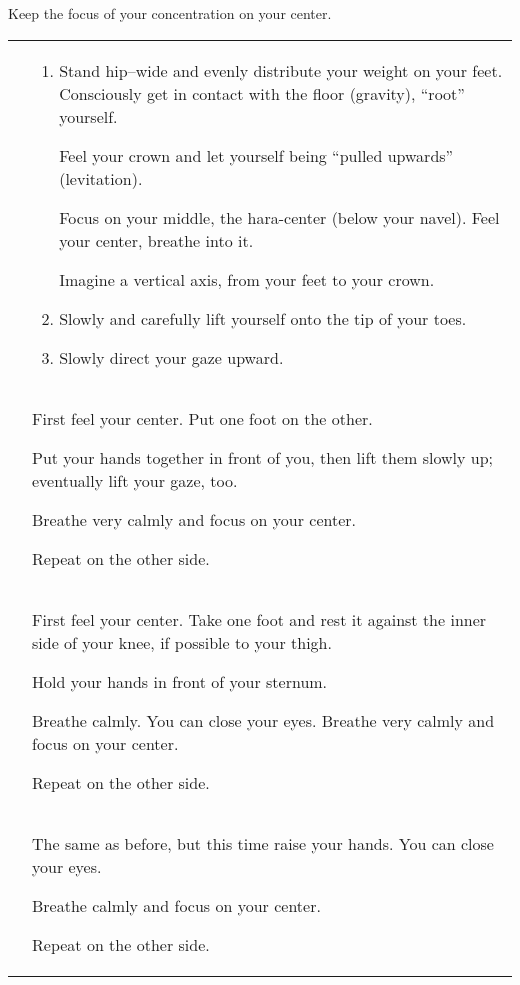\documentclass[../main.tex]{subfiles}
\begin{document}
\label{Ex:Equi}

Keep the focus of your concentration on your center.

\noindent
\begin{tabular}{p{3cm} p{9cm} }
 \raisebox{-1.4\totalheight}{\texttt{[image: EqEx1]}} & 
\begin{enumerate}[label=\alph*)]
\item Stand hip--wide and evenly distribute your weight on your feet. Consciously get in {contact with the floor} (gravity), ``root'' yourself.

Feel your {crown} and let yourself being ``pulled upwards'' (levitation).

Focus on your middle, the hara-center\index{hara center} (below your navel).
Feel your {center}, breathe into it.

Imagine a {vertical axis}\index{central vertical axis}, from your feet to your crown.

\item Slowly and carefully {lift yourself} onto the tip of your toes.
                                      
\item Slowly direct your {gaze upward}.
\end{enumerate}
  \\
   \raisebox{-0.8\totalheight}{\texttt{[image: EqEx2]}} & 
First feel your center. Put {one foot on the other}. 

Put your {hands together} in front of you, then {lift them} slowly up; eventually lift your gaze, too.

Breathe very calmly and focus on your center.

Repeat on the other side.
  \\
   \raisebox{-0.8\totalheight}{\texttt{[image: EqEx3]}} & 
First feel your center. Take one {foot} 
and rest it against the {inner side of your knee}, if possible to your {thigh}.

Hold your hands in front of your sternum.

Breathe calmly. You can close your eyes. Breathe very calmly and focus on your center.

Repeat on the other side.
  \\
   \raisebox{-0.6\totalheight}{\texttt{[image: EqEx4]}} & 
The same as before, but this time {raise your hands}. You can close your eyes.

Breathe calmly and focus on your center.

Repeat on the other side.

\end{tabular}
\end{document}

